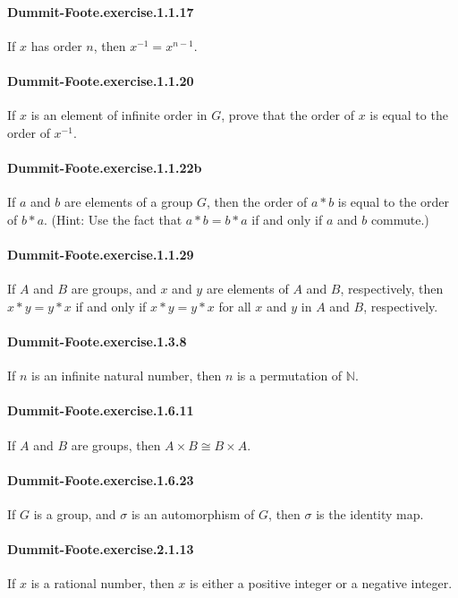 \documentclass{article}
\begin{document}
\paragraph{Dummit-Foote.exercise.1.1.17} If $x$ has order $n$, then $x^{-1} = x^{n-1}$.

\paragraph{Dummit-Foote.exercise.1.1.20} If $x$ is an element of infinite order in $G$, prove that the order of $x$ is equal to the order of $x^{-1}$.

\paragraph{Dummit-Foote.exercise.1.1.22b} If $a$ and $b$ are elements of a group $G$, then the order of $a * b$ is equal to the order of $b * a$. (Hint: Use the fact that $a * b = b * a$ if and only if $a$ and $b$ commute.)

\paragraph{Dummit-Foote.exercise.1.1.29} If $A$ and $B$ are groups, and $x$ and $y$ are elements of $A$ and $B$, respectively, then $x*y = y*x$ if and only if $x*y = y*x$ for all $x$ and $y$ in $A$ and $B$, respectively.

\paragraph{Dummit-Foote.exercise.1.3.8} If $n$ is an infinite natural number, then $n$ is a permutation of $\mathbb{N}$.

\paragraph{Dummit-Foote.exercise.1.6.11} If $A$ and $B$ are groups, then $A \times B \cong B \times A$.

\paragraph{Dummit-Foote.exercise.1.6.23} If $G$ is a group, and $\sigma$ is an automorphism of $G$, then $\sigma$ is the identity map.

\paragraph{Dummit-Foote.exercise.2.1.13} If $x$ is a rational number, then $x$ is either a positive integer or a negative integer.
\end{document}

